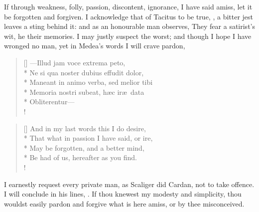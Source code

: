 {If through weakness, folly, passion, discontent, ignorance, I have
said amiss, let it be forgotten and forgiven. I acknowledge that of
 Tacitus to be true, , a bitter jest leaves a sting behind it:
and as an honourable man observes, They fear a satirist's wit, he
their memories. I may justly suspect the worst; and though I hope I
have wronged no man, yet in Medea's words I will crave pardon,

\begin{latin}
\settowidth{\versewidth}{Maneant in animo verba, sed melior tibi}
\begin{verse}[\versewidth]
---Illud jam voce extrema peto,\\*
Ne si qua noster dubius effudit dolor,\\*
Maneant in animo verba, sed melior tibi\\*
Memoria nostri subeat, h\ae{}c ir\ae{}\ data\\*
Obliterentur---\\!
\end{verse}
\end{latin}

\settowidth{\versewidth}{That what in passion I have said, or ire,}
\begin{verse}[\versewidth]
And in my last words this I do desire,\\*
That what in passion I have said, or ire,\\*
May be forgotten, and a better mind,\\*
Be had of us, hereafter as you find.\\!
\end{verse}

I earnestly request every private man, as Scaliger did Cardan, not to
take offence. I will conclude in his lines, . If thou knewest my modesty and simplicity, thou wouldst
easily pardon and forgive what is here amiss, or by thee misconceived.

}
